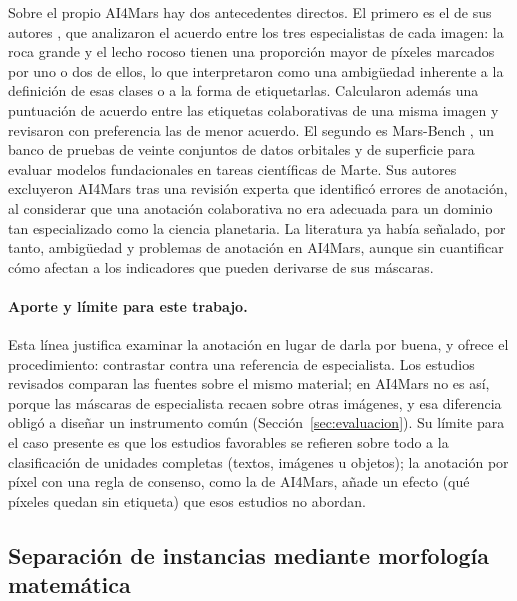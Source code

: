 Sobre el propio AI4Mars hay dos antecedentes directos. El primero es el de sus autores
\citep{swan2021ai4mars}, que analizaron el acuerdo entre los tres especialistas de cada imagen:
la roca grande y el lecho rocoso tienen una proporción mayor de píxeles marcados por uno o dos
de ellos, lo que interpretaron como una ambigüedad inherente a la definición de esas clases o a
la forma de etiquetarlas. Calcularon además una puntuación de acuerdo entre las etiquetas
colaborativas de una misma imagen y revisaron con preferencia las de menor acuerdo. El segundo
es Mars-Bench \citep{purohit2025marsbench}, un banco de pruebas de veinte conjuntos de datos
orbitales y de superficie para evaluar modelos fundacionales en tareas científicas de Marte. Sus
autores excluyeron AI4Mars tras una revisión experta que identificó errores de anotación, al
considerar que una anotación colaborativa no era adecuada para un dominio tan especializado como
la ciencia planetaria. La literatura ya había señalado, por tanto, ambigüedad y problemas de
anotación en AI4Mars, aunque sin cuantificar cómo afectan a los indicadores que pueden
derivarse de sus máscaras.

\paragraph{Aporte y límite para este trabajo.} Esta línea justifica examinar la anotación en
lugar de darla por buena, y ofrece el procedimiento: contrastar contra una referencia de
especialista. Los estudios revisados comparan las fuentes sobre el mismo material; en AI4Mars
no es así, porque las máscaras de especialista recaen sobre otras imágenes, y esa diferencia
obligó a diseñar un instrumento común (Sección~\ref{sec:evaluacion}). Su límite para el caso
presente es que los estudios favorables se refieren sobre todo a la clasificación de unidades
completas (textos, imágenes u objetos); la anotación por píxel con una regla de consenso,
como la de AI4Mars, añade un efecto (qué píxeles quedan sin etiqueta) que esos estudios no
abordan.

\subsection{Separación de instancias mediante morfología matemática}
\label{sec:rev-morfologia}

